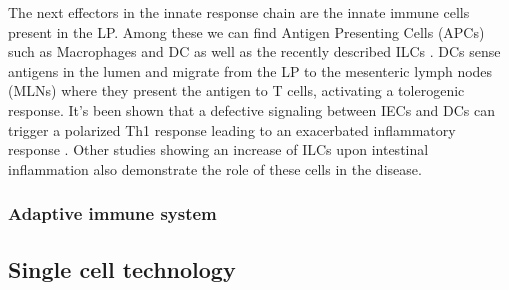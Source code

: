 \documentclass[../main.tex]{subfiles}
\begin{document}
The next effectors in the innate response chain are the innate immune cells present in the LP. Among these we can find Antigen Presenting Cells (APCs) such as Macrophages and DC as well as the recently described ILCs \citep{spits_expanding_2011}. DCs sense antigens in the lumen and migrate from the LP to the mesenteric lymph nodes (MLNs) where they present the antigen to T cells, activating a tolerogenic response. It's been shown that a defective signaling between IECs and DCs can trigger a polarized Th1 response leading to an exacerbated inflammatory response \citep{rimoldi_intestinal_2005}. Other studies showing an increase of ILCs upon intestinal inflammation \citep{eken_il-23r_2014} also demonstrate the role of these cells in the disease. 

\subsubsection{Adaptive immune system}
\lipsum[1-1]


\subsection{Single cell technology}
\lipsum[1-1]
\end{document}
